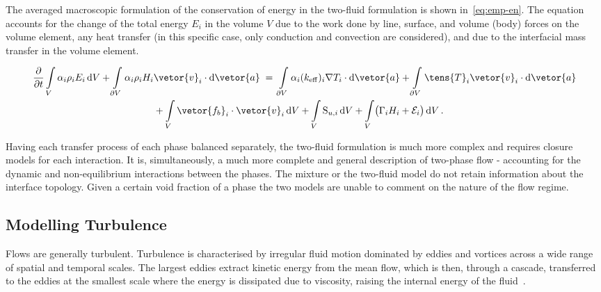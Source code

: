 
The averaged macroscopic formulation of the conservation of energy in the two-fluid formulation is 
 shown in~\eqref{eq:emp-en}. The equation accounts for the change of the total energy $E_{i}$ in the 
 volume $V$ due to the work done by line, surface, and volume (body) forces on the volume element,
 any heat transfer (in this specific case, only conduction and convection are considered),
 and due to the interfacial mass transfer in the volume element. 
  
\begin{align}\label{eq:emp-en}
\frac{\partial}{\partial t}
\int\limits_{V} \alpha_{i} \rho_{i} E_{i} \,\mathrm{d}V
+ \int\limits_{\partial V} \alpha_{i} \rho_{i} H_{i}&
\vetor{v}_{i} \cdot \mathrm{d}\vetor{a}
\;=\;
\int\limits_{\partial V} \alpha_{i} (k_{\mathrm{eff}})_{i} \nabla T_{i} \cdot \mathrm{d}\vetor{a}
+ \int\limits_{\partial V} \tens{T}_{i} \vetor{v}_{i} \cdot \mathrm{d}\vetor{a}\nonumber \\
& + \int\limits_{V} \vetor{f_{b}}_{i} \cdot \vetor{v}_{i} \,\mathrm{d}V
+ \int\limits_{V} \mathrm{S}_{u,i} \,\mathrm{d}V + \int\limits_{V} \bigl(\Gamma_{i}H_{i} + \mathcal{E}_{i}\bigr)\,\mathrm{d}V\,.
\end{align} 

Having each transfer process of each phase balanced separately, 
 the two-fluid formulation is much more complex and requires closure models
 for each interaction. It is, simultaneously, a much more
 complete and general description of two-phase flow - accounting for the dynamic and non-equilibrium 
 interactions between the phases. The mixture or the two-fluid model do not retain information about the interface topology.
 Given a certain void fraction of a phase the two models are
 unable to comment on the nature of the flow regime.~\cite{ishiiThermoFluidDynamicsTwoPhase2011}

\subsection{Modelling Turbulence}\label{sec:turbs}
Flows are generally turbulent. Turbulence is characterised by irregular fluid motion dominated by
 eddies and vortices across a wide range of spatial and temporal scales. The largest eddies
 extract kinetic energy from the mean flow, which is then, through a cascade, transferred
 to the eddies at
 the smallest scale where the energy is dissipated due to viscosity, raising the 
 internal energy of the fluid~\cite{gilmanDevelopmentGeneralPurpose2014, davidsonIntroductionTurbulenceModels}.

